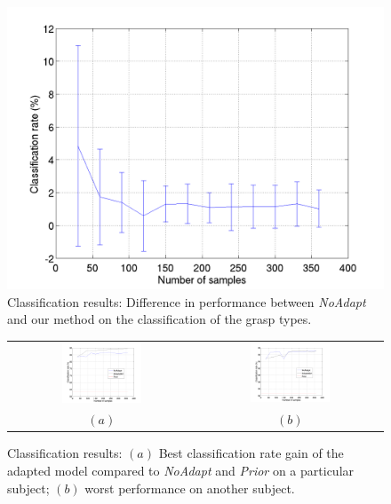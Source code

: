 \begin{figure}[t]
  \centering
  \includegraphics[width=0.95\linewidth]{figs/exp1}
  \caption{Classification results: Difference in performance between \emph{NoAdapt} and our method  on the
 classification of the grasp types.}
  \label{fig:diff_cla}
\end{figure}

\begin{figure}[ht] \centering
  \begin{tabular}{cc}
    \includegraphics[width=0.45\textwidth]{figs/exp1_abs_best} &
    \includegraphics[width=0.45\textwidth]{figs/exp1_abs_worst} \\
    $(a)$ & $(b)$ \\
  \end{tabular}
  \caption{Classification results: $(a)$ Best classification rate gain of the adapted model compared to
 \emph{NoAdapt} and \emph{Prior} on a particular subject; $(b)$ worst performance on another subject.}
  \label{fig:cla_abs}
\end{figure}

